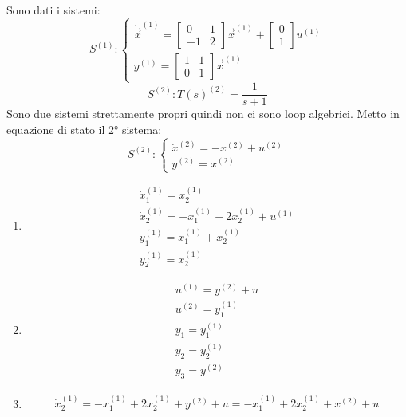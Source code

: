 \documentclass[../main.tex]{subfiles}
\begin{document}
			\begin{Exercise}[title={Studiare propriet\'a di sistemi interconnessi}, difficulty=3]
				Sono dati i sistemi:
				\[
					S^{(1)}:
					\begin{cases}
						\dot{\vec x}^{(1)} =
						\begin{bmatrix}
							0 & 1\\
							-1 & 2
						\end{bmatrix}
						\vec x^{(1)} +
						\begin{bmatrix}
							0\\
							1
						\end{bmatrix} u^{(1)}
						\\
						y^{(1)} =
						\begin{bmatrix}
							1 & 1\\
							0 & 1
						\end{bmatrix} \vec x^{(1)}
					\end{cases}
				\]
				\[
					S^{(2)}: T(s)^{(2)}=\dfrac{1}{s+1}
				\]
				Sono due sistemi strettamente propri quindi non ci sono loop algebrici. Metto in equazione di stato il 2° sistema:
				\[
					S^{(2)}:
					\begin{cases}
						\dot x^{(2)} = -x^{(2)} + u^{(2)}\\
						y^{(2)} = x^{(2)}
					\end{cases}
				\]
				\begin{enumerate}
					\item 
						\begin{align*}
							\dot x^{(1)}_1 = x^{(1)}_2\\
							\dot x^{(1)}_2 = -x^{(1)}_1 + 2x^{(1)}_2 + u^{(1)}\\
							y^{(1)}_1 = x^{(1)}_1 + x^{(1)}_2\\
							y^{(1)}_2 = x^{(1)}_2
						\end{align*}
					\item 
						\begin{align*}
							u^{(1)} = y^{(2)} + u\\
							u^{(2)} = y^{(1)}_1\\
							y_1 = y^{(1)}_1\\
							y_2 = y^{(1)}_2\\
							y_3 = y^{(2)}
						\end{align*}
					\item 
						\begin{align*}
							\dot x^{(1)}_2 = -x^{(1)}_1 + 2x^{(1)}_2 + y^{(2)} + u = -x^{(1)}_1 + 2x^{(1)}_2 + x^{(2)} + u\\

\end{align*}
\end{enumerate}
\end{Exercise}
\end{document}
